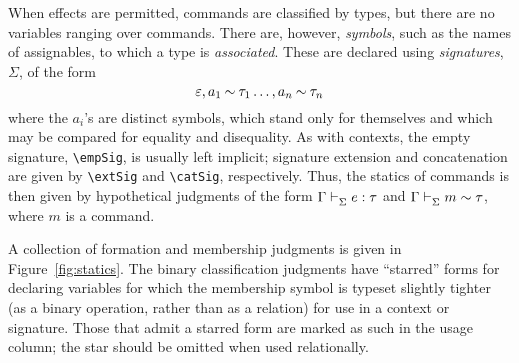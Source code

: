 \documentclass[11pt]{article}
\begin{document}
When effects are permitted, commands are classified by types, but there are no variables ranging over commands.  There are, however, \emph{symbols}, such as the names of assignables, to which a type is \emph{associated}.  These are declared using \emph{signatures}, $\Sigma$, of the form
\[
    \extSig{\extSig{\empSig}{\hasTp*{a_1}{\tau_1}}\dots}{\hasTp*{a_n}{\tau_n}}
\]
where the $a_i$'s are distinct symbols, which stand only for themselves and which may be compared for equality and disequality.  As with contexts, the empty signature, \verb|\empSig|, is usually left implicit; signature extension and concatenation are given by \verb|\extSig| and \verb|\catSig|, respectively.  Thus, the statics of commands is then given by hypothetical judgments of the form $\Gamma\entails[\Sigma] \isOf{e}{\tau}$ and $\Gamma\entails[\Sigma] \hasTp{m}{\tau}$, where $m$ is a command.

\smallskip

A collection of formation and membership judgments is given in Figure~\ref{fig:statics}.  The binary classification judgments have ``starred'' forms for declaring variables for which the membership symbol is typeset slightly tighter (as a binary operation, rather than as a relation) for use in a context or signature.  Those that admit a starred form are marked as such in the usage column; the star should be omitted when used relationally.
\end{document}

